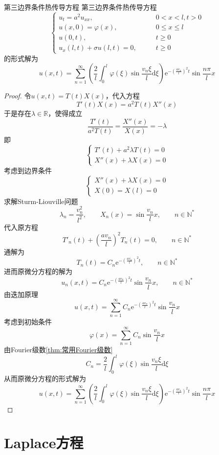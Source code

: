 \documentclass[lang = cn, scheme = chinese, thmcnt = section]{elegantbook}
\newcommand{\N}{\mathbb{N}}            %
\newcommand{\R}{\mathbb{R}}            %
\newcommand{\dd}{\mathrm{d}}           %
\begin{document}
\begin{theorem}{第三边界条件热传导方程}
	第三边界条件热传导方程
	$$
	\begin{cases}
		u_t=a^2u_{xx},\qquad & 0<x<l,t>0\\
		u(x,0)=\varphi(x),\qquad & 0\le x\le l\\
		u(0,t),\qquad & t\ge 0\\
		u_x(l,t)+\sigma u(l,t)=0,\qquad & t\ge 0
	\end{cases}
	$$
	的形式解为
	$$
	u(x,t)=\sum_{n=1}^{\infty}\left(\frac{2}{l}\int_{0}^{l}\varphi(\xi)\sin\frac{v_n\xi}{l}\dd\xi\right)\mathrm{e}^{-\left(\frac{av_n}{l}\right)^2t}\sin\frac{n\pi}{l}x
	$$
\end{theorem}

\begin{proof}
	令$u(x,t)=T(t)X(x)$，代入方程
	$$
	T'(t)X(x)=a^2T(t)X''(x)
	$$
	于是存在$\lambda\in\R$，使得成立
	$$
	\frac{T'(t)}{a^2T(t)}
	=\frac{X''(x)}{X(x)}
	=-\lambda
	$$
	即%
	$$
	\begin{cases}
		T'(t)+a^2\lambda T(t)=0\\
		X''(x)+\lambda X(x)=0
	\end{cases}
	$$
	考虑到边界条件%
	$$
	\begin{cases}
		X''(x)+\lambda X(x)=0\\
		X(0)=X(l)=0
	\end{cases}
	$$
	求解Sturm-Liouville问题
	$$
	\lambda_n=\frac{v_n^2}{l^2},\qquad 
	X_n(x)=\sin\frac{v_n}{l}x,\qquad n\in\N^*
	$$
	代入原方程
	$$
	T'_n(t)+\left(\frac{av_n}{l}\right)^2 T_n(t)=0,\qquad n\in\N^*
	$$
	通解为
	$$
	T_n(t)=C_n\mathrm{e}^{-\left(\frac{av_n}{l}\right)^2t},\qquad n\in\N^*
	$$
	进而原微分方程的解为
	$$
	u_n(x,t)=C_n\mathrm{e}^{-\left(\frac{av_n}{l}\right)^2t}\sin\frac{v_n}{l}x,\qquad n\in\N^*
	$$
	由迭加原理
	$$
	u(x,t)=\sum_{n=1}^{\infty}C_n\mathrm{e}^{-\left(\frac{av_n}{l}\right)^2t}\sin\frac{v_n}{l}x
	$$
	考虑到初始条件
	$$
	\varphi(x)=\sum_{n=1}^{\infty}C_n\sin\frac{v_n}{l}x
	$$
	由Fourier级数\ref{thm:常用Fourier级数}
	$$
	C_n=\frac{2}{l}\int_{0}^{l}\varphi(\xi)\sin\frac{v_n\xi}{l}\dd\xi
	$$
	从而原微分方程的形式解为
	$$
	u(x,t)=\sum_{n=1}^{\infty}\left(\frac{2}{l}\int_{0}^{l}\varphi(\xi)\sin\frac{v_n\xi}{l}\dd\xi\right)\mathrm{e}^{-\left(\frac{av_n}{l}\right)^2t}\sin\frac{n\pi}{l}x
	$$
\end{proof}

\section{Laplace方程}
\end{document}
